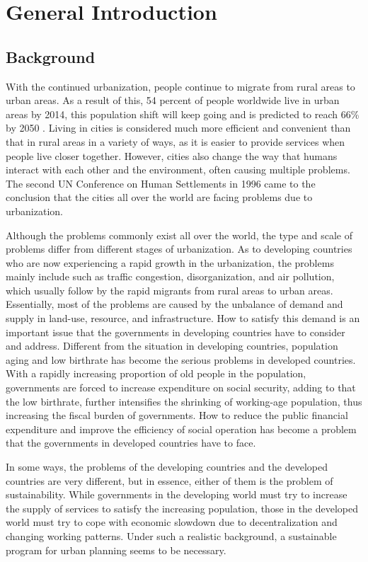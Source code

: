\chapter{General Introduction}
%
\section{Background}
With the continued urbanization, people continue to migrate from rural areas to urban areas. As a result of this, 54 percent of people worldwide live in urban areas by 2014, this population shift will keep going and is predicted to reach 66\% by 2050 \cite{UN2014world}. Living in cities is considered much more efficient and convenient than that in rural areas in a variety of ways, as it is easier to provide services when people live closer together. However, cities also change the way that humans interact with each other and the environment, often causing multiple problems. The second UN Conference on Human Settlements in 1996 came to the conclusion that the cities all over the world are facing problems due to urbanization.

 
Although the problems commonly exist all over the world, the type and scale of problems differ from different stages of urbanization. As to developing countries who are now experiencing a rapid growth in the urbanization, the problems mainly include such as traffic congestion, disorganization, and air pollution, which usually follow by the rapid migrants from rural areas to urban areas. Essentially, most of the problems are caused by the unbalance of demand and supply in land-use, resource, and infrastructure. How to satisfy this demand is an important issue that the governments in developing countries have to consider and address. Different from the situation in developing countries, population aging and low birthrate has become the serious problems in developed countries. With a rapidly increasing proportion of old people in the population, governments are forced to increase expenditure on social security, adding to that the low birthrate, further intensifies the shrinking of working-age population, thus increasing the fiscal burden of governments. How to reduce the public financial expenditure and improve the efficiency of social operation has become a problem that the governments in developed countries have to face. 

In some ways, the problems of the developing countries and the developed countries are very different, but in essence, either of them is the problem of sustainability. While governments in the developing world must try to increase the supply of services to satisfy the increasing population, those in the developed world must try to cope with economic slowdown due to decentralization and changing working patterns. Under such a realistic background, a sustainable program for urban planning seems to be necessary.

